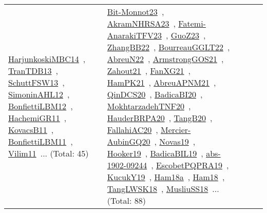{\begin{longtable}{lp{3cm}>{\raggedright\arraybackslash}p{6cm}>{\raggedright\arraybackslash}p{6cm}>{\raggedright\arraybackslash}p{8cm}}
\href{../works/HarjunkoskiMBC14.pdf}{HarjunkoskiMBC14}~\cite{HarjunkoskiMBC14}, \href{../works/TranTDB13.pdf}{TranTDB13}~\cite{TranTDB13}, \href{../works/SchuttFSW13.pdf}{SchuttFSW13}~\cite{SchuttFSW13}, \href{../works/SimoninAHL12.pdf}{SimoninAHL12}~\cite{SimoninAHL12}, \href{../works/BonfiettiLBM12.pdf}{BonfiettiLBM12}~\cite{BonfiettiLBM12}, \href{../works/HachemiGR11.pdf}{HachemiGR11}~\cite{HachemiGR11}, \href{../works/KovacsB11.pdf}{KovacsB11}~\cite{KovacsB11}, \href{../works/BonfiettiLBM11.pdf}{BonfiettiLBM11}~\cite{BonfiettiLBM11}, \href{../works/Vilim11.pdf}{Vilim11}~\cite{Vilim11}... (Total: 45) & \href{../works/Bit-Monnot23.pdf}{Bit-Monnot23}~\cite{Bit-Monnot23}, \href{../works/AkramNHRSA23.pdf}{AkramNHRSA23}~\cite{AkramNHRSA23}, \href{../works/Fatemi-AnarakiTFV23.pdf}{Fatemi-AnarakiTFV23}~\cite{Fatemi-AnarakiTFV23}, \href{../works/GuoZ23.pdf}{GuoZ23}~\cite{GuoZ23}, \href{../works/ZhangBB22.pdf}{ZhangBB22}~\cite{ZhangBB22}, \href{../works/BourreauGGLT22.pdf}{BourreauGGLT22}~\cite{BourreauGGLT22}, \href{../works/AbreuN22.pdf}{AbreuN22}~\cite{AbreuN22}, \href{../works/ArmstrongGOS21.pdf}{ArmstrongGOS21}~\cite{ArmstrongGOS21}, \href{../works/Zahout21.pdf}{Zahout21}~\cite{Zahout21}, \href{../works/FanXG21.pdf}{FanXG21}~\cite{FanXG21}, \href{../works/HamPK21.pdf}{HamPK21}~\cite{HamPK21}, \href{../works/AbreuAPNM21.pdf}{AbreuAPNM21}~\cite{AbreuAPNM21}, \href{../works/QinDCS20.pdf}{QinDCS20}~\cite{QinDCS20}, \href{../works/BadicaBI20.pdf}{BadicaBI20}~\cite{BadicaBI20}, \href{../works/MokhtarzadehTNF20.pdf}{MokhtarzadehTNF20}~\cite{MokhtarzadehTNF20}, \href{../works/HauderBRPA20.pdf}{HauderBRPA20}~\cite{HauderBRPA20}, \href{../works/TangB20.pdf}{TangB20}~\cite{TangB20}, \href{../works/FallahiAC20.pdf}{FallahiAC20}~\cite{FallahiAC20}, \href{../works/Mercier-AubinGQ20.pdf}{Mercier-AubinGQ20}~\cite{Mercier-AubinGQ20}, \href{../works/Novas19.pdf}{Novas19}~\cite{Novas19}, \href{../works/Hooker19.pdf}{Hooker19}~\cite{Hooker19}, \href{../works/BadicaBIL19.pdf}{BadicaBIL19}~\cite{BadicaBIL19}, \href{../works/abs-1902-09244.pdf}{abs-1902-09244}~\cite{abs-1902-09244}, \href{../works/EscobetPQPRA19.pdf}{EscobetPQPRA19}~\cite{EscobetPQPRA19}, \href{../works/KucukY19.pdf}{KucukY19}~\cite{KucukY19}, \href{../works/Ham18a.pdf}{Ham18a}~\cite{Ham18a}, \href{../works/Ham18.pdf}{Ham18}~\cite{Ham18}, \href{../works/TangLWSK18.pdf}{TangLWSK18}~\cite{TangLWSK18}, \href{../works/MusliuSS18.pdf}{MusliuSS18}~\cite{MusliuSS18}... (Total: 88)\\

\end{longtable}}
